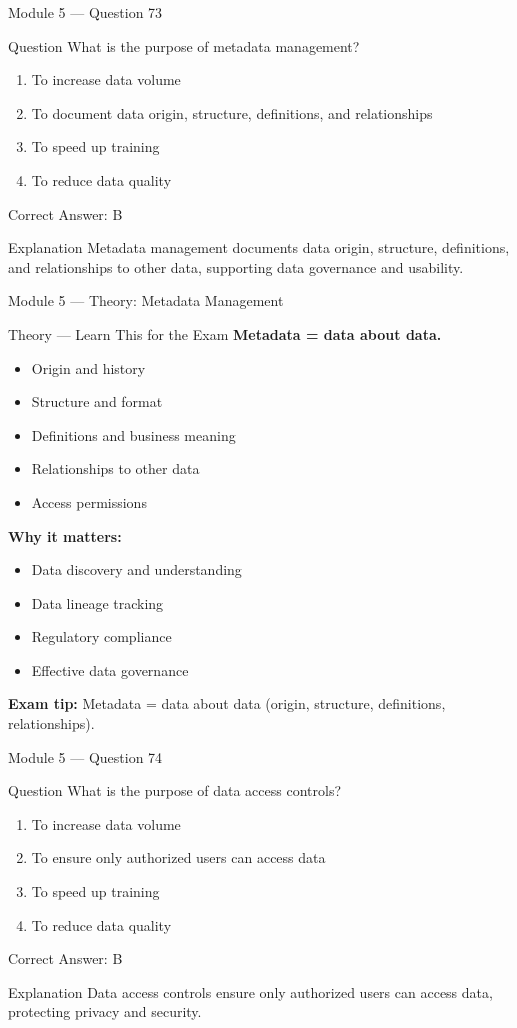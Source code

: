 \documentclass[aspectratio=169,10pt]{beamer}
\newcommand{\question}[1]{%
	\begin{block}{Question}
		#1
	\end{block}
}
\newcommand{\options}[4]{%
	\begin{enumerate}[label=\Alph*.,leftmargin=*]
		\item #1
		\item #2
		\item #3
		\item #4
	\end{enumerate}
}
\newcommand{\answerbox}[1]{%
	\begin{exampleblock}{Correct Answer: #1}
	\end{exampleblock}
}
\newcommand{\explain}[1]{%
	\begin{block}{Explanation}
		\small #1
	\end{block}
}
\newcommand{\theory}[1]{%
	\begin{block}{Theory --- Learn This for the Exam}
		\small #1
	\end{block}
}
\begin{document}
	\begin{frame}{Module 5 --- Question 73}
		\question{What is the purpose of metadata management?}
		\options{To increase data volume}{To document data origin, structure, definitions, and relationships}{To speed up training}{To reduce data quality}
		\answerbox{B}
		\explain{Metadata management documents data origin, structure, definitions, and relationships to other data, supporting data governance and usability.}
	\end{frame}
	
	\begin{frame}{Module 5 --- Theory: Metadata Management}
		\theory{
			\textbf{Metadata = data about data.}
			\begin{itemize}
				\item Origin and history
				\item Structure and format
				\item Definitions and business meaning
				\item Relationships to other data
				\item Access permissions
			\end{itemize}
			\textbf{Why it matters:}
			\begin{itemize}
				\item Data discovery and understanding
				\item Data lineage tracking
				\item Regulatory compliance
				\item Effective data governance
			\end{itemize}
			\textbf{Exam tip:} Metadata = data about data (origin, structure, definitions, relationships).
		}
	\end{frame}
	
	\begin{frame}{Module 5 --- Question 74}
		\question{What is the purpose of data access controls?}
		\options{To increase data volume}{To ensure only authorized users can access data}{To speed up training}{To reduce data quality}
		\answerbox{B}
		\explain{Data access controls ensure only authorized users can access data, protecting privacy and security.}
	\end{frame}
	
\end{document}
